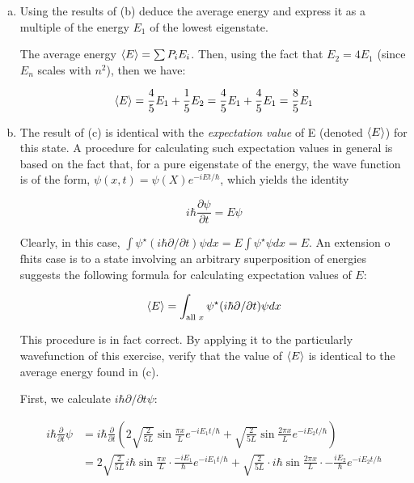 \documentclass[10pt]{article}
\begin{document}
\begin{enumerate}[(a)]
        \item Using the results of (b) deduce the average energy and express it as a multiple of the energy $E_1$ of the lowest eigenstate. 
        
        \begin{solution}
            The average energy $\langle E \rangle = \sum P_iE_i$. Then, using the fact that $E_2 = 4E_1$ (since $E_n$ scales with $n^2$), then we have:

            \[ \langle E \rangle = \frac 45 E_1 + \frac 15 E_2 = \frac 45 E_1 + \frac 45 E_1 = \frac 85 E_1\] 
        \end{solution}

        \item The result of (c) is identical with the \textit{expectation value} of E (denoted $\langle E \rangle$) for this state. A procedure for calculating such expectation values in general is based on the fact that, for a pure eigenstate of the energy, the wave function is of the form, $\psi(x, t) = \psi(X) e^{-iEt/\hbar}$, which yields the identity

        \[ i\hbar \frac{\partial \psi}{\partial t} = E \psi\] 

        Clearly, in this case, $\int \psi^\star (i\hbar \partial/\partial t) \psi dx = E \int \psi^\star \psi dx = E$. An extension o fhits case is to a state involving an arbitrary superposition of energies suggests the following formula for calculating expectation values of $E$: 

        \[ \langle E \rangle = \int_{\text{all $x$}} \psi^\star (i\hbar \partial/\partial t) \psi dx\]

        This procedure is in fact correct. By applying it to the particularly wavefunction of this exercise, verify that the value of $\langle E \rangle$ is identical to the average energy found in (c).


        \begin{solution}
            First, we calculate $i\hbar \partial/\partial t \psi$: 

            \begin{align*}
                i\hbar \frac{\partial}{\partial t} \psi &= i\hbar \frac{\partial}{\partial t}\left(2 \sqrt{\frac{2}{5L}} \sin \frac{\pi x}{L} e^{-iE_1t/\hbar} + \sqrt{\frac{2}{5L}}\sin \frac{2\pi x}{L} e^{-iE_2t/\hbar}\right)\\
                &= 2\sqrt{\frac{2}{5L}}i\hbar \sin \frac{\pi x}{L} \cdot \frac{-iE_1}{\hbar} e^{-iE_1t/\hbar} + \sqrt{\frac{2}{5L}} \cdot i\hbar \sin \frac{2\pi x}{L} \cdot -\frac{iE_2}{\hbar} e^{-iE_2t/\hbar}
            \end{align*}


\end{solution}
\end{enumerate}
\end{document}
